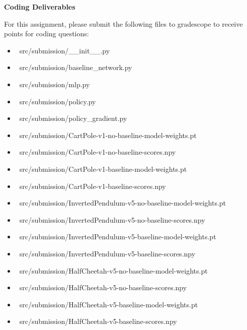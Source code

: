 \textbf{Coding Deliverables}

For this assignment, please submit the following files to gradescope to receive points for coding questions:
\begin{itemize}
    \item ~src/submission/__init__.py~
    \item ~src/submission/baseline_network.py~
    \item ~src/submission/mlp.py~
    \item ~src/submission/policy.py~
    \item ~src/submission/policy_gradient.py~
    \item ~src/submission/CartPole-v1-no-baseline-model-weights.pt~
    \item ~src/submission/CartPole-v1-no-baseline-scores.npy~
    \item ~src/submission/CartPole-v1-baseline-model-weights.pt~
    \item ~src/submission/CartPole-v1-baseline-scores.npy~
    \item ~src/submission/InvertedPendulum-v5-no-baseline-model-weights.pt~
    \item ~src/submission/InvertedPendulum-v5-no-baseline-scores.npy~
    \item ~src/submission/InvertedPendulum-v5-baseline-model-weights.pt~
    \item ~src/submission/InvertedPendulum-v5-baseline-scores.npy~
    \item ~src/submission/HalfCheetah-v5-no-baseline-model-weights.pt~
    \item ~src/submission/HalfCheetah-v5-no-baseline-scores.npy~
    \item ~src/submission/HalfCheetah-v5-baseline-model-weights.pt~
    \item ~src/submission/HalfCheetah-v5-baseline-scores.npy~ \\
\end{itemize}  

\clearpage
